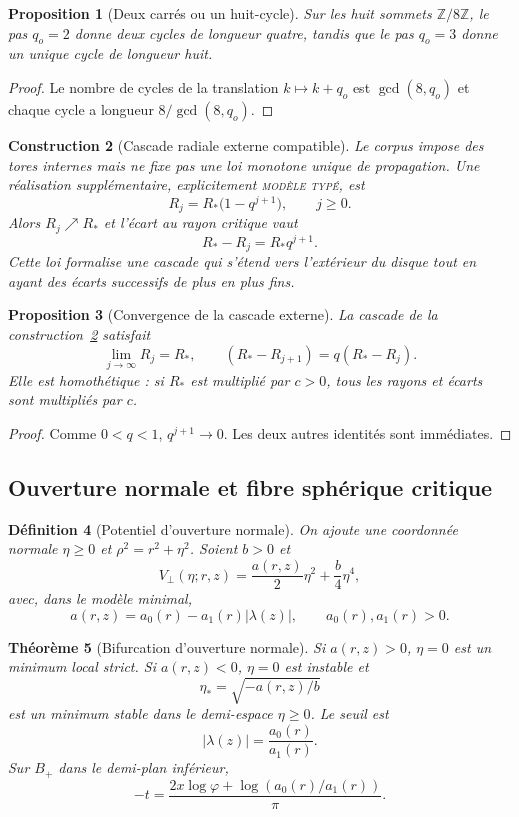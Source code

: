 \documentclass[11pt,a4paper]{article}
\newtheorem{theorem}{Théorème}[section]
\newtheorem{proposition}[theorem]{Proposition}
\newtheorem{definition}[theorem]{Définition}
\newtheorem{construction}[theorem]{Construction}
\newcommand{\Z}{\mathbb Z}
\newcommand{\ph}{\varphi}
\newcommand{\statusTyped}{\textsc{modèle typé}}
\begin{document}
\begin{proposition}[Deux carrés ou un huit-cycle]
Sur les huit sommets $\Z/8\Z$, le pas $q_o=2$ donne deux cycles de longueur quatre, tandis que le pas $q_o=3$ donne un unique cycle de longueur huit.
\end{proposition}

\begin{proof}
Le nombre de cycles de la translation $k\mapsto k+q_o$ est $\gcd(8,q_o)$ et chaque cycle a longueur $8/\gcd(8,q_o)$.
\end{proof}

\begin{construction}[Cascade radiale externe compatible]\label{cons:outward}
Le corpus impose des tores internes mais ne fixe pas une loi monotone unique de propagation. Une réalisation supplémentaire, explicitement \statusTyped, est
\[
 R_j=R_*\bigl(1-q^{j+1}\bigr),\qquad j\ge0.
\]
Alors $R_j\nearrow R_*$ et l'écart au rayon critique vaut
\[
 R_*-R_j=R_*q^{j+1}.
\]
Cette loi formalise une cascade qui s'étend vers l'extérieur du disque tout en ayant des écarts successifs de plus en plus fins.
\end{construction}

\begin{proposition}[Convergence de la cascade externe]
La cascade de la construction~\ref{cons:outward} satisfait
\[
 \lim_{j\to\infty}R_j=R_*,
 \qquad
 (R_*-R_{j+1})=q(R_*-R_j).
\]
Elle est homothétique : si $R_*$ est multiplié par $c>0$, tous les rayons et écarts sont multipliés par $c$.
\end{proposition}

\begin{proof}
Comme $0<q<1$, $q^{j+1}\to0$. Les deux autres identités sont immédiates.
\end{proof}

\subsection{Ouverture normale et fibre sphérique critique}

\begin{definition}[Potentiel d'ouverture normale]
On ajoute une coordonnée normale $\eta\ge0$ et $\rho^2=r^2+\eta^2$. Soient $b>0$ et
\[
 V_\perp(\eta;r,z)=\frac{a(r,z)}2\eta^2+\frac b4\eta^4,
\]
avec, dans le modèle minimal,
\[
 a(r,z)=a_0(r)-a_1(r)|\lambda(z)|,
 \qquad a_0(r),a_1(r)>0.
\]
\end{definition}

\begin{theorem}[Bifurcation d'ouverture normale]\label{thm:opening}
Si $a(r,z)>0$, $\eta=0$ est un minimum local strict. Si $a(r,z)<0$, $\eta=0$ est instable et
\[
 \eta_* = \sqrt{-a(r,z)/b}
\]
est un minimum stable dans le demi-espace $\eta\ge0$. Le seuil est
\begin{equation}\label{eq:opening-threshold}
 |\lambda(z)|=\frac{a_0(r)}{a_1(r)}.
\end{equation}
Sur $B_+$ dans le demi-plan inférieur,
\[
 -t=\frac{2x\log\ph+\log(a_0(r)/a_1(r))}{\pi}.
\]
\end{theorem}
\end{document}
